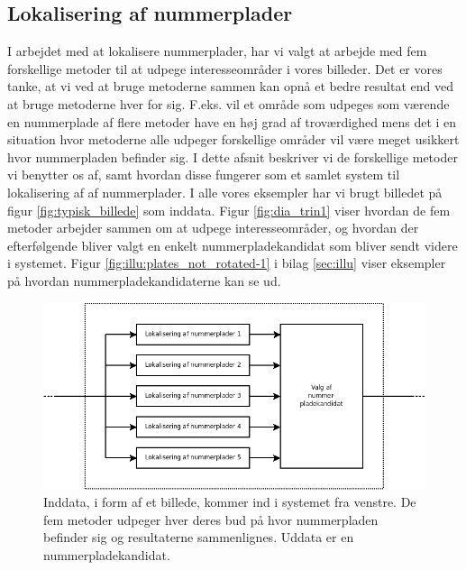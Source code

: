 \label{sec_billed}

\subsection{Lokalisering af nummerplader}
\label{sec:system:lokalisering}
I arbejdet med at lokalisere nummerplader, har vi valgt at arbejde med fem forskellige metoder til at udpege interesseområder i vores billeder. Det er vores tanke, at vi ved at bruge metoderne sammen kan opnå et bedre resultat end ved at bruge metoderne hver for sig. F.eks. vil et område som udpeges som værende en nummerplade af flere metoder have en høj grad af troværdighed mens det i en situation hvor metoderne alle udpeger forskellige områder vil være meget usikkert hvor nummerpladen befinder sig. I dette afsnit beskriver vi de forskellige metoder vi benytter os af, samt hvordan disse fungerer som et samlet system til lokalisering af af nummerplader. I alle vores eksempler har vi brugt billedet på figur \vref{fig:typisk_billede} som inddata. Figur \vref{fig:dia_trin1} viser hvordan de fem metoder  arbejder sammen om at udpege interesseområder, og hvordan der efterfølgende bliver valgt en enkelt nummerpladekandidat som bliver sendt videre i systemet. Figur \vref{fig:illu:plates_not_rotated-1} i bilag \ref{sec:illu} viser eksempler på hvordan nummerpladekandidaterne kan se ud.


\begin{figure}[htp]
\centering
\includegraphics[width=12cm]{system/illu/dia_trin1.png} 
\caption{Inddata, i form af et billede, kommer ind i systemet fra venstre. De fem metoder udpeger hver deres bud på hvor nummerpladen befinder sig og resultaterne sammenlignes. Uddata er en nummerpladekandidat.}
\label{fig:dia_trin1}
\end{figure}

